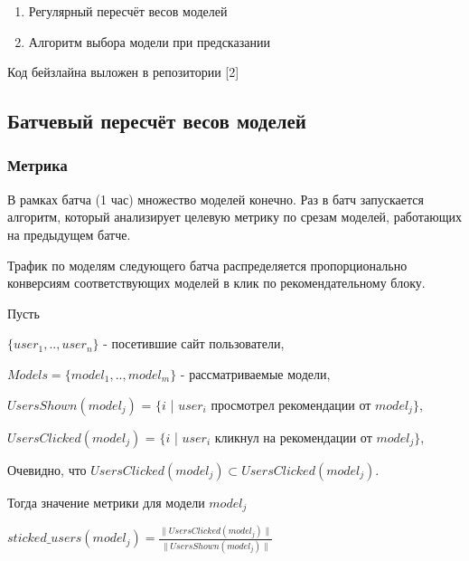 \documentclass{article}
\begin{document}
\begin{enumerate}  
\item Регулярный пересчёт весов моделей
\item Алгоритм выбора модели при предсказании
\end{enumerate}

Код бейзлайна выложен в репозитории [2]

\subsection{Батчевый пересчёт весов моделей}

\subsubsection{Метрика}

В рамках батча (1 час) множество моделей конечно. 
Раз в батч запускается алгоритм, который анализирует целевую метрику по срезам моделей, работающих на предыдущем батче.
\par
Трафик по моделям следующего батча распределяется пропорционально конверсиям соответствующих моделей в клик по рекомендательному блоку.
\par
Пусть

\par
\vspace{3mm}
$\{ user_1, .., user_n \}$ - посетившие сайт пользователи,

\par 
\vspace{3mm}
$Models = \{ model_1, .., model_m \}$ - рассматриваемые модели,

\par
\vspace{3mm}
$UsersShown(model_j)$ = $\{ i$ | $user_i$ просмотрел рекомендации от $model_j \}$,

\par
\vspace{3mm}
$UsersClicked(model_j)$ = $\{ i$ | $user_i$ кликнул на рекомендации от $model_j \}$,

\par
\vspace{3mm}
Очевидно, что $UsersClicked(model_j) \subset UsersClicked(model_j)$.

\par 
\vspace{3mm}
Тогда значение метрики для модели $model_j$

\par
\vspace{3mm}
$sticked\_users(model_j) = \frac{\|UsersClicked(model_j)\|}{\|UsersShown(model_j)\|}$
\end{document}
